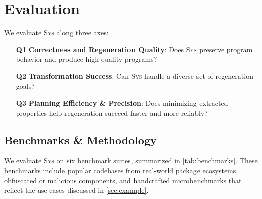 \documentclass[sigplan]{acmart}
\newcommand{\sys}{{\scshape Sys}\xspace}
\begin{document}
\section{Evaluation}

We evaluate \sys along three axes:

\begin{itemize}
  \item[\textbf{Q1}] \textbf{Correctness and Regeneration Quality}: Does \sys preserve program behavior and produce high-quality programs?
  \item[\textbf{Q2}] \textbf{Transformation Success}: Can \sys handle a diverse set of regeneration goals?
  \item[\textbf{Q3}] \textbf{Planning Efficiency \& Precision}: Does minimizing extracted properties help regeneration succeed faster and more reliably?
\end{itemize}

\subsection{Benchmarks \& Methodology}

We evaluate \sys on six benchmark suites, summarized in \cref{tab:benchmarks}.
These benchmarks include popular codebases from real-world package ecosystems, obfuscated or malicious components, and handcrafted microbenchmarks that reflect the use cases discussed in \cref{sec:example}.
\end{document}
